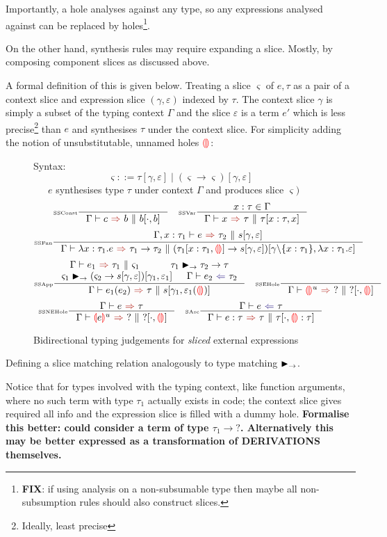 Importantly, a hole analyses against any type, so any expressions analysed against can be replaced by holes\footnote{\textbf{FIX}: if using analysis on a non-subsumable type then maybe all non-subsumption rules should also construct slices.}.\par 
On the other hand, synthesis rules may require expanding a slice. Mostly, by composing component slices as discussed above.
\par 
A formal definition of this is given below. Treating a slice $\varsigma$ of $e,\tau$ as a pair of a context slice and expression slice $(\gamma, \varepsilon)$ indexed by $\tau$. The context slice $\gamma$ is simply a subset of the typing context $\Gamma$ and the slice $\varepsilon$ is a term $e'$ which is less precise\footnote{Ideally, least precise} than $e$ and synthesises $\tau$ under the context slice. For simplicity adding the notion of unsubstitutable, unnamed holes ${\color{red}\llparenthesis}  {\color{red}\rrparenthesis}$: 

\begin{figure}[H]
\small
Syntax:
\[\varsigma ::= \tau[\gamma, \varepsilon] \mid (\varsigma \to \varsigma) [\gamma,\varepsilon]\]
\ \ \ $e$ synthesises type $\tau$ under context $\Gamma$ and produces slice $\varsigma)$
\tiny
\[\inference[\tiny SSConst]{}{\synthesisSlice{c}{b}{b[\cdot, b]}} \quad
\inference[\tiny SSVar]{x : \tau \in \Gamma}{\synthesisSlice{x}{\tau}{\tau[x:\tau,x]}}\]
\[ 
\inference[\tiny SSFun]{\synthesisSlice[\Gamma,x:\tau_1]{e}{\tau_2}{s[\gamma, \varepsilon]}}{\synthesisSlice{\lambda x:\tau_1.e}{\tau_1 \to \tau_2}{(\tau_1[x:\tau_1,\hole] \to s[\gamma, \varepsilon])[\gamma\backslash\{x:\tau_1\},\lambda x:\tau_1. \varepsilon]}}
\]
\[
\inference[\tiny SSApp]{\synthesisSlice{e_1}{\tau_1}{\varsigma_1} & \tau_1 \funmatch \tau_2 \to \tau \\
\varsigma_1 \funmatch (\varsigma_2 \to s[\gamma,\varepsilon])[\gamma_1, \varepsilon_1] & \analysis{e_2}{\tau_2}}{\synthesisSlice{e_1(e_2)}{\tau}{s[\gamma_1, \varepsilon_1(\hole)]}} \quad 
\inference[\tiny SSEHole]{}{\synthesisSlice{\hole^u}{?}{?[\cdot, \hole]}} 
\]
\[
\inference[\tiny SSNEHole]{\synthesis{e}{\tau}}{\synthesisSlice{\hole[e]^u}{?}{?[\cdot, \hole]}}\quad 
\inference[\tiny SAsc]{\analysis{e}{\tau}}{\synthesisSlice{e : \tau}{\tau}{\tau[\cdot, \hole : \tau]}}
\]
\caption{Bidirectional typing judgements for \textit{sliced} external expressions}
\label{fig:typingsliced}
\end{figure}
Defining a slice matching relation analogously to type matching $\blacktriangleright_\rightarrow$.\par
Notice that for types involved with the typing context, like function arguments, where no such term with type $\tau_1$ actually exists in code; the context slice gives required all info and the expression slice is filled with a dummy hole. \textbf{Formalise this better: could consider a term of type $\tau_1 \to ?$. Alternatively this may be better expressed as a transformation of DERIVATIONS themselves.}\par 

